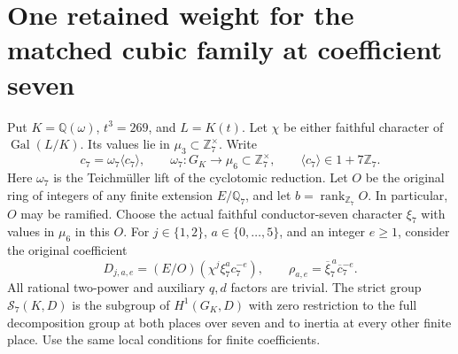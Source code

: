 \section{One retained weight for the matched cubic family at coefficient seven}
\label{sec:mixed-cubic-residual-trivial-higher-lifting}

Put $K=\mathbb Q(\omega)$, $t^3=269$, and $L=K(t)$.
Let $\chi$ be either faithful character of $\operatorname{Gal}(L/K)$.
Its values lie in $\mu_3\subset\mathbb Z_7^\times$.
Write
\[
 c_7=\omega_7\langle c_7\rangle,\qquad
 \omega_7:G_K\longrightarrow\mu_6\subset\mathbb Z_7^\times,
 \qquad \langle c_7\rangle\in1+7\mathbb Z_7.
 \tag{MRT.1}
\]
Here $\omega_7$ is the Teichm\"uller lift of the cyclotomic reduction.
Let $O$ be the original ring of integers of any finite extension
$E/\mathbb Q_7$, and let $b=\operatorname{rank}_{\mathbb Z_7}O$.
In particular, $O$ may be ramified.  Choose the actual faithful
conductor-seven character $\xi_7$ with values in $\mu_6$ in this $O$.
For $j\in\{1,2\}$, $a\in\{0,\ldots,5\}$, and an integer $e\geq1$,
consider the original coefficient
\[
 D_{j,a,e}=(E/O)(\chi^j\xi_7^a c_7^{-e}),\qquad
 \rho_{a,e}=\overline{\xi}_7^{\,a}\overline c_7^{-e}.
 \tag{MRT.2}
\]
All rational two-power and auxiliary $q,d$ factors are trivial.
The strict group $\mathcal S_7(K,D)$ is the subgroup of
$H^1(G_K,D)$ with zero restriction to the full decomposition group
at both places over seven and to inertia at every other finite place.
Use the same local conditions for finite coefficients.

